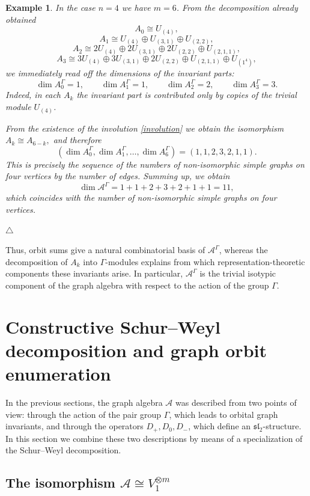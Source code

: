 \documentclass[12pt,reqno]{amsart}
\newtheorem{example}{Example}[section]
\begin{document}
\begin{example}{\rm
In the case $n=4$ we have $m=6$. From the decomposition already obtained
$$
A_0\cong U_{(4)},
$$
$$
A_1\cong
U_{(4)}\oplus U_{(3,1)}\oplus U_{(2,2)},
$$
$$
A_2\cong
2U_{(4)}
\oplus
2U_{(3,1)}
\oplus
2U_{(2,2)}
\oplus
U_{(2,1,1)},
$$
$$
A_3\cong
3U_{(4)}
\oplus
3U_{(3,1)}
\oplus
2U_{(2,2)}
\oplus
U_{(2,1,1)}
\oplus
U_{(1^4)},
$$
we immediately read off the dimensions of the invariant parts:
$$
\dim A_0^\Gamma=1,\qquad
\dim A_1^\Gamma=1,\qquad
\dim A_2^\Gamma=2,\qquad
\dim A_3^\Gamma=3.
$$
Indeed, in each $A_k$ the invariant part is contributed only by copies of the
trivial module $U_{(4)}$.

From the existence of the involution \eqref{involution} we obtain the
isomorphism
$
A_k\cong A_{6-k},
$
and therefore
$$
(\dim A_0^\Gamma,\dim A_1^\Gamma,\dots,\dim A_6^\Gamma)
=
(1,1,2,3,2,1,1).
$$
This is precisely the sequence of the numbers of non-isomorphic simple graphs
on four vertices by the number of edges. Summing up, we obtain
$$
\dim\mathcal A^\Gamma
=
1+1+2+3+2+1+1
=
11,
$$
which coincides with the number of non-isomorphic simple graphs on four
vertices.
}
$\triangle$
\end{example}

Thus, orbit sums give a natural combinatorial basis of $\mathcal A^\Gamma$,
whereas the decomposition of $A_k$ into $\Gamma$-modules explains from which
representation-theoretic components these invariants arise. In particular,
$\mathcal A^\Gamma$ is the trivial isotypic component of the graph algebra
with respect to the action of the group $\Gamma$.



\section{Constructive Schur--Weyl decomposition and graph orbit enumeration}

In the previous sections, the graph algebra $\mathcal A$ was described from
two points of view: through the action of the pair group $\Gamma$, which leads
to orbital graph invariants, and through the operators $D_+,D_0,D_-$, which
define an $\mathfrak{sl}_2$-structure. In this section we combine these two
descriptions by means of a specialization of the Schur--Weyl decomposition.

\subsection{The isomorphism $\mathcal A\cong V_1^{\otimes m}$}
\end{document}
